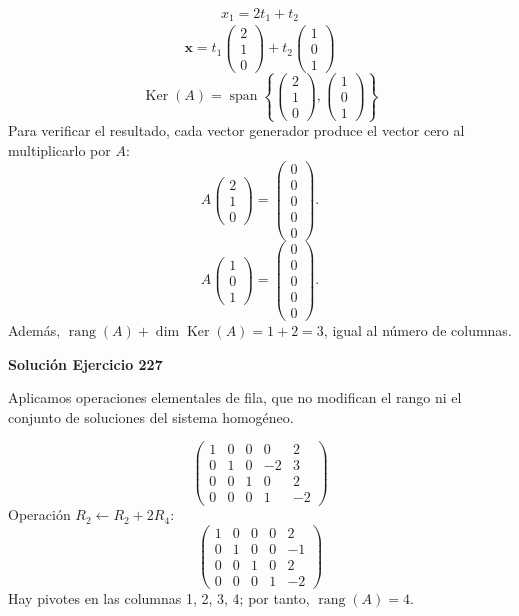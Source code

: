 \documentclass[12pt]{article}
\theoremstyle{remark}
\newcommand{\rang}{\operatorname{rang}}
\newcommand{\Ker}{\operatorname{Ker}}
\newcommand{\vect}[1]{\boldsymbol{#1}}
\begin{document}
\[
\begin{aligned}x_{1}=2 t_{1} + t_{2}\end{aligned}
\]
\[
\vect x=t_{1}\begin{pmatrix}2\\1\\0\end{pmatrix} + t_{2}\begin{pmatrix}1\\0\\1\end{pmatrix}
\]
\[
\boxed{\Ker(A)=\operatorname{span}\left\{\begin{pmatrix}2\\1\\0\end{pmatrix},\begin{pmatrix}1\\0\\1\end{pmatrix}\right\}}
\]
Para verificar el resultado, cada vector generador produce el vector cero al multiplicarlo por $A$:
\[
A\begin{pmatrix}2\\1\\0\end{pmatrix}=\begin{pmatrix}0\\0\\0\\0\\0\end{pmatrix}.
\]
\[
A\begin{pmatrix}1\\0\\1\end{pmatrix}=\begin{pmatrix}0\\0\\0\\0\\0\end{pmatrix}.
\]
Además, $\rang(A)+\dim\Ker(A)=1+2=3$, igual al número de columnas.


\par\bigskip\noindent\textbf{Solución Ejercicio 227}\par\nobreak
Aplicamos operaciones elementales de fila, que no modifican el rango ni el conjunto de soluciones del sistema homogéneo.

\[
\begin{pmatrix}1&0&0&0&2\\0&1&0&-2&3\\0&0&1&0&2\\0&0&0&1&-2\end{pmatrix}
\]
Operación $R_{2}\leftarrow R_{2}+2R_{4}$:
\[
\begin{pmatrix}1&0&0&0&2\\0&1&0&0&-1\\0&0&1&0&2\\0&0&0&1&-2\end{pmatrix}
\]
Hay pivotes en las columnas 1, 2, 3, 4; por tanto, $\boxed{\rang(A)=4}$.
\end{document}
